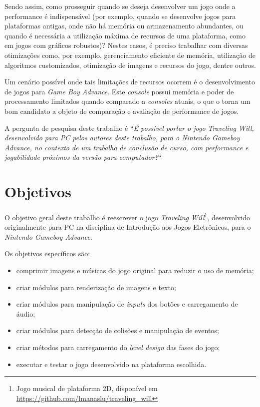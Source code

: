 Sendo assim, como prosseguir quando se deseja desenvolver um jogo onde a performance é indispensável (por exemplo, quando se desenvolve jogos para plataformas antigas, onde não há memória ou armazenamento abundantes, ou quando é necessária a utilização máxima de recursos de uma plataforma, como em jogos com gráficos robustos)? Nestes casos, é preciso trabalhar com diversas otimizações como, por exemplo, gerenciamento eficiente de memória, utilização de algoritmos customizados, otimização de imagens e recursos do jogo, dentre outros.

Um cenário possível onde tais limitações de recursos ocorrem é o desenvolvimento de jogos para \textit{Game Boy Advance}. Este \textit{console} possui memória e poder de processamento limitados quando comparado a \textit{consoles} atuais, o que o torna um bom candidato a objeto de comparação e avaliação de performance de jogos.

A pergunta de pesquisa deste trabalho é ``\textit{É possível portar o jogo Traveling Will, desenvolvido para PC pelos autores deste trabalho, para o Nintendo Gameboy Advance, no contexto de um trabalho de conclusão de curso, com performance e jogabilidade próximos da versão para computador?}``

\section*{Objetivos}

O objetivo geral deste trabalho é reescrever o jogo \textit{Traveling Will}\footnote{Jogo musical de plataforma 2D, disponível em \url{https://github.com/lmanaslu/traveling_will}}, desenvolvido originalmente para PC na disciplina de Introdução aos Jogos Eletrônicos, para o \textit{Nintendo Gameboy Advance}.

Os objetivos específicos são:

\begin{itemize}
\item comprimir imagens e músicas do jogo original para reduzir o uso de memória;
\item criar módulos para renderização de imagens e texto;
\item criar módulos para manipulação de \textit{inputs} dos botões e carregamento de áudio;
\item criar módulos para detecção de colisões e manipulação de eventos;
\item criar métodos para carregamento do \textit{level design} das fases do jogo;
\item executar e testar o jogo desenvolvido na plataforma escolhida.
\end{itemize}


